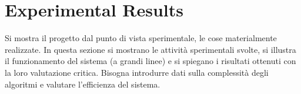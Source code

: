 \chapter{Experimental Results}
\label{ch6_exp}
\thispagestyle{empty}

\vspace{0.5cm}

\noindent Si mostra il progetto dal punto di vista sperimentale, le cose 
materialmente realizzate. In questa sezione si mostrano le attivit\`a 
sperimentali svolte, si illustra il funzionamento del sistema (a grandi linee) e 
si spiegano i risultati ottenuti con la loro valutazione critica. Bisogna 
introdurre dati sulla complessit\`a degli algoritmi e valutare l'efficienza del 
sistema.


